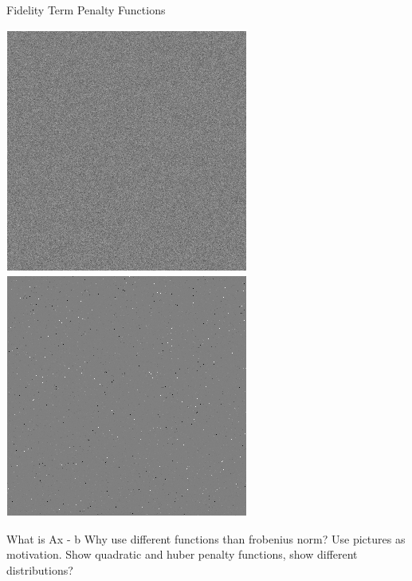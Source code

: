 \documentclass[12pt]{beamer}
\begin{document}
\begin{frame}{Fidelity Term Penalty Functions}
\begin{minipage}{0.45\textwidth}

\begin{center}
\vspace{-2 mm}
\includegraphics[scale=0.35]{../figures/gaussian_noise.png} \\
\includegraphics[scale=0.35]{../figures/student_t_noise.png} 
\end{center}

\end{minipage} \hfill
\begin{minipage}{0.52\textwidth}

What is Ax - b
Why use different functions than frobenius norm?  Use pictures as motivation. Show quadratic and huber penalty functions, show different distributions?

\end{minipage}
\end{frame}
\end{document}
